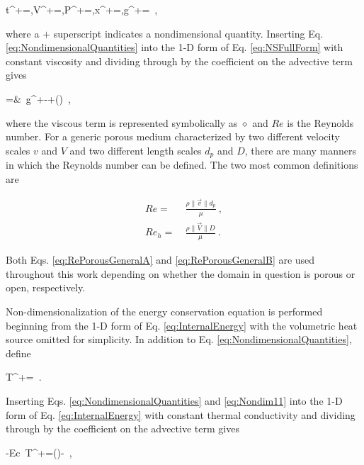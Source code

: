 \beq
\label{eq:NondimensionalQuantities}
t^+=,\quad V^+=,\quad P^+=,\quad x^+=,\quad g^+=\ ,
\eeq

\noindent where a \(+\) superscript indicates a nondimensional quantity. Inserting Eq. \eqref{eq:NondimensionalQuantities} into the 1-D form of Eq. \eqref{eq:NSFullForm} with constant viscosity and dividing through by the coefficient on the advective term gives

\beqa
\label{eq:NondimensionalNS2}
=&\ g^+-+\left(\diamond\right)\ ,
\eeqa

\noindent where the viscous term is represented symbolically as \(\diamond\) and \(Re\) is the Reynolds number. For a generic porous medium characterized by two different velocity scales \(v\) and \(V\) and two different length scales \(d_p\) and \(D\), there are many manners in which the Reynolds number can be defined. The two most common definitions are

\begin{subequations}
\label{eq:RePorousGeneral}
\begin{align}
\label{eq:RePorousGeneralA}
Re=&\ \frac{\rho \|\vec{v}\|d_p}{\mu}\ ,\\
\label{eq:RePorousGeneralB}
Re_h=&\ \frac{\rho \|\vec{V}\|D}{\mu}\ .
\end{align}
\end{subequations}

\noindent Both Eqs. \eqref{eq:RePorousGeneralA} and \eqref{eq:RePorousGeneralB} are used throughout this work depending on whether the domain in question is porous or open, respectively. 

Non-dimensionalization of the energy conservation equation is performed beginning from the 1-D form of Eq. \eqref{eq:InternalEnergy} with the volumetric heat source omitted for simplicity. In addition to Eq. \eqref{eq:NondimensionalQuantities}, define

\beq
\label{eq:Nondim11}
T^+=\ .
\eeq

\noindent Inserting Eqs. \eqref{eq:NondimensionalQuantities} and \eqref{eq:Nondim11} into the 1-D form of Eq. \eqref{eq:InternalEnergy} with constant thermal conductivity and dividing through by the coefficient on the advective term gives

\beq
\label{eq:NondimensionalTemperatureEqn}
-\beta Ec\ T^+=(\diamond)-\ ,
\eeq


